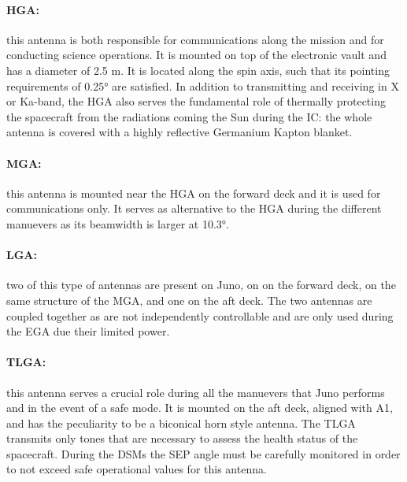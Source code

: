 \vspace{-1mm}

\paragraph{HGA:}this antenna is both responsible for communications along the mission and for conducting science operations.\cite{juno_telecommunication} It is mounted on top of the electronic vault and has a diameter of 2.5 m. It is located along the spin axis, such that its pointing requirements of 0.25° are satisfied.\cite{telecommunication_antennas} In addition to transmitting and receiving in X or Ka-band, the HGA also serves the fundamental role of thermally protecting the spacecraft from the radiations coming the Sun during the IC: the whole antenna is covered with a highly reflective Germanium Kapton blanket.\cite{ge_kapton}

\vspace{-4mm}

\paragraph{MGA:}this antenna is mounted near the HGA on the forward deck and it is used for communications only. It serves as alternative to the HGA during the different manuevers as its beamwidth is larger at 10.3°.\cite{juno_telecommunication} 

\vspace{-4mm}

\paragraph{LGA:}two of this type of antennas are present on Juno, on on the forward deck, on the same structure of the MGA, and one on the aft deck. The two antennas are coupled together as are not independently controllable and are only used during the EGA due their limited power.\cite{juno_telecommunication} 

\vspace{-4mm}

\paragraph{TLGA:}this antenna serves a crucial role during all the manuevers that Juno performs and in the event of a safe mode. It is mounted on the aft deck, aligned with A1, and has the peculiarity to be a biconical horn style antenna. The TLGA transmits only tones that are necessary to assess the health status of the spacecraft. During the DSMs the SEP angle must be carefully monitored in order to not exceed safe operational values for this antenna.\cite{juno_telecommunication}

